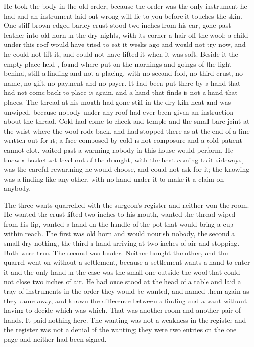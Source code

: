 He took the body in the old order, because the order was the only instrument he had and an instrument laid out wrong will lie to you before it touches the skin. One stiff brown-edged barley crust stood two inches from his ear, gone past leather into old horn in the dry nights, with its corner a hair off the wool; a child under this roof would have tried to eat it weeks ago and would not try now, and he could not lift it, and could not have lifted it when it was soft. Beside it the empty place held , found where put on the mornings and goings of the light behind, still a finding and not a placing, with no second fold, no third crust, no name, no gift, no payment and no payer. It had been put there by a hand that had not come back to place it again, and a hand that finds is not a hand that places. The thread at his mouth had gone stiff in the dry kiln heat and was unwiped, because nobody under any roof had ever been given an instruction about the thread. Cold had come to cheek and temple and the small bare joint at the wrist where the wool rode back, and had stopped there as at the end of a line written out for it; a face composed by cold is not composure and a cold patient cannot clot.  waited past a warming nobody in this house would perform. He knew a basket set level out of the draught, with the heat coming to it sideways, was the careful rewarming he would choose, and could not ask for it; the knowing was a finding like any other, with no hand under it to make it a claim on anybody.

The three wants quarrelled with the surgeon's register and neither won the room. He wanted the crust lifted two inches to his mouth, wanted the thread wiped from his lip, wanted a hand on the handle of the pot that would bring a cup within reach. The first was old horn and would nourish nobody, the second a small dry nothing, the third a hand arriving at two inches of air and stopping. Both were true. The second was louder. Neither bought the other, and the quarrel went on without a settlement, because a settlement wants a hand to enter it and the only hand in the case was the small one outside the wool that could not close two inches of air. He had once stood at the head of a table and laid a tray of instruments in the order they would be wanted, and named them again as they came away, and known the difference between a finding and a want without having to decide which was which. That was another room and another pair of hands. It paid nothing here. The wanting was not a weakness in the register and the register was not a denial of the wanting; they were two entries on the one page and neither had been signed.

